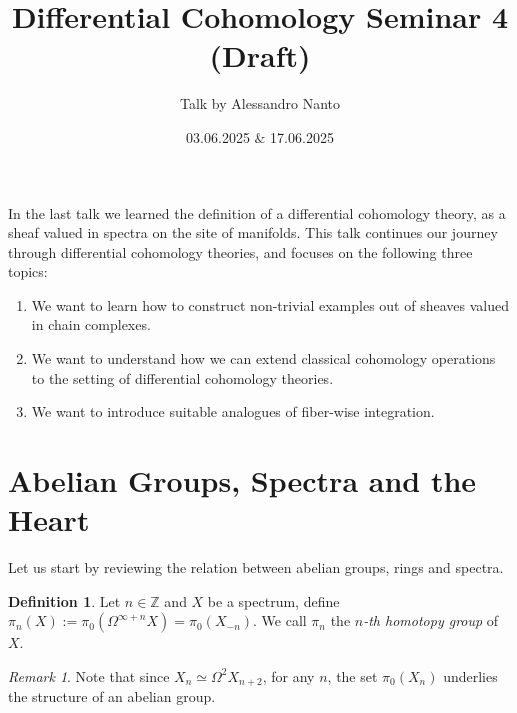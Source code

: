 \documentclass[10pt]{amsart}
\title{Differential Cohomology Seminar 4 (Draft)}
\date{03.06.2025 $\&$ 17.06.2025}
\author{Talk by Alessandro Nanto}
\newcommand{\bZ}{\mathbb{Z}}
\theoremstyle{definition}
\newtheorem{definition}[equation]{Definition}
\theoremstyle{remark}
\newtheorem{remark}[equation]{Remark}
\begin{document}
\maketitle

In the last talk we learned the definition of a differential cohomology theory, as a sheaf valued in spectra on the site of manifolds. This talk continues our journey through differential cohomology theories, and focuses on the following three topics:
\begin{enumerate}
  \item We want to learn how to construct non-trivial examples out of sheaves valued in chain complexes.
  \item We want to understand how we can extend classical cohomology operations to the setting of differential cohomology theories.
  \item We want to introduce suitable analogues of fiber-wise integration.  
\end{enumerate}

\section{Abelian Groups, Spectra and the Heart}
Let us start by reviewing the relation between abelian groups, rings and spectra. 
\begin{definition}
    Let $n\in\bZ$ and $X$ be a spectrum, define $\pi_n(X):=\pi_0(\Omega^{\infty+n}X)=\pi_0(X_{-n})$. We call $\pi_n$ the \textit{$n$-th homotopy group} of $X$. 
\end{definition}
\begin{remark}
 Note that since $X_n\simeq\Omega^2X_{n+2}$, for any $n$, the set $\pi_0(X_n)$ underlies the structure of an abelian group.
\end{remark}
\end{document}
